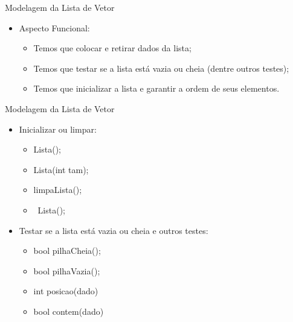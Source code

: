 \documentclass[12pt,table,xcolor={dvipsnames}]{beamer}
\begin{document}
\begin{frame}[fragile]{Modelagem da Lista de Vetor}

\begin{itemize}
\item Aspecto Funcional:
\begin{itemize}
\item Temos que colocar e retirar dados da lista;
\item Temos que testar se a lista está vazia ou cheia (dentre outros testes);
\item Temos que inicializar a lista e garantir a ordem de seus elementos.
\end{itemize}
\end{itemize}
\end{frame}

\begin{frame}[fragile]{Modelagem da Lista de Vetor}

\begin{itemize}
\item Inicializar ou limpar:
\begin{itemize}
\item Lista();
\item Lista(int tam);
\item limpaLista();
\item ~Lista();
\end{itemize}
\item Testar se a lista está vazia ou cheia e outros testes:
\begin{itemize}
\item bool pilhaCheia();
\item bool pilhaVazia();
\item int posicao(dado)
\item bool contem(dado)
\end{itemize}
\end{itemize}
\end{frame}
\end{document}
